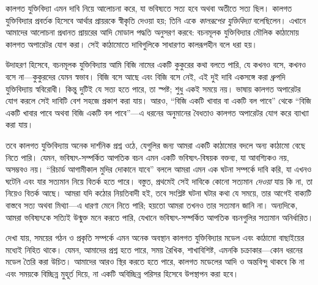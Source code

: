 \documentclass[../../../include/open-logic-section]{subfiles}
\begin{document}


কালগত যুক্তিবিদ্যা এমন দাবি নিয়ে আলোচনা করে, যা ভবিষ্যতে সত্য হবে অথবা অতীতে সত্য ছিল। কালগত যুক্তিবিদ্যার প্রবর্তক হিসেবে আর্থার প্রায়রকে স্বীকৃতি দেওয়া হয়; তিনি একে \emph{কালরূপের যুক্তিবিদ্যা} বলেছিলেন। এখানে আমাদের আলোচনা প্রধানত প্রায়রের আদি মোডাল পদ্ধতি অনুসরণ করবে: বচনমূলক যুক্তিবিদ্যার মৌলিক কাঠামোয় কালগত অপারেটর যোগ করা। সেই কাঠামোতে দাবিগুলিকে সাধারণত কালরূপহীন বলে ধরা হয়।

উদাহরণ হিসেবে, বচনমূলক যুক্তিবিদ্যায় আমি বিজি নামের একটি কুকুরের কথা বলতে পারি, যে কখনও বসে, কখনও বসে না—কুকুরদের যেমন স্বভাব। বিজি বসে আছে এবং বিজি বসে নেই, এই দুই দাবি একসঙ্গে করা ধ্রুপদি যুক্তিবিদ্যায় স্ববিরোধী। কিন্তু দুটিই যে সত্য হতে পারে, তা স্পষ্ট; শুধু একই সময়ে নয়। ভাষায় কালগত অপারেটর যোগ করলে সেই দাবিটি বেশ সহজে প্রকাশ করা যায়। আরও, ``বিজি একটি খাবার বা একটি বল পাবে'' থেকে ``বিজি একটি খাবার পাবে অথবা বিজি একটি বল পাবে''—এ ধরনের অনুমানের বৈধতাও কালগত অপারেটর যোগ করে ব্যাখ্যা করা যায়।

তবে কালগত যুক্তিবিদ্যায় অনেক দার্শনিক প্রশ্ন ওঠে, যেগুলির জন্য আমরা একটি কাঠামোর বদলে অন্য কাঠামো বেছে নিতে পারি। যেমন, ভবিষ্যৎ-সম্পর্কিত আপতিক বচন এমন একটি ভবিষ্যৎ-বিষয়ক বক্তব্য, যা আবশ্যিকও নয়, অসম্ভবও নয়। ``রিচার্ড আগামীকাল মুদির দোকানে যাবে'' বললে আমরা এমন এক ঘটনা সম্পর্কে দাবি করি, যা এখনও ঘটেনি এবং যার সত্যমান নিয়ে বিতর্ক হতে পারে। বস্তুত, প্রথমেই সেই দাবিকে কোনো সত্যমান \emph{দেওয়া} যায় কি না, তা নিয়েও বিতর্ক আছে। আমরা যদি কঠোর নিয়তিবাদী হই, তবে সংশ্লিষ্ট ঘটনা ঘটার কথা যে সময়ে, তার আগেই বাক্যটি বাস্তবে সত্য অথবা মিথ্যা—এ ধারণা মেনে নিতে পারি; হয়তো আমরা তখনও তার সত্যমান জানি না। অন্যদিকে, আমরা ভবিষ্যৎকে সত্যিই উন্মুক্ত মনে করতে পারি, যেখানে ভবিষ্যৎ-সম্পর্কিত আপতিক বচনগুলির সত্যমান অনির্ধারিত।

দেখা যায়, সময়ের গঠন ও প্রকৃতি সম্পর্কে এমন অনেক অবস্থান কালগত যুক্তিবিদ্যার মডেল এবং কাঠামো বাছাইয়ের মধ্যেই নিহিত থাকে। যেমন, আমাদের প্রশ্ন হতে পারে, সময় রৈখিক, শাখাবিশিষ্ট, এমনকি চক্রাকার—কোন ধরনের মডেল তৈরি করা উচিত। আমাদের আরও স্থির করতে হতে পারে, কালগত মডেলের আদি ও অন্তবিন্দু থাকবে কি না এবং সময়কে বিচ্ছিন্ন মুহূর্ত দিয়ে, না একটি অবিচ্ছিন্ন পরিসর হিসেবে উপস্থাপন করা হবে।
\end{document}
